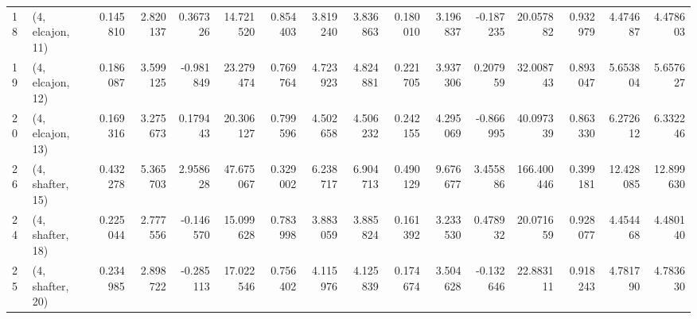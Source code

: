 \begin{tabular}{llrrrrrrrrrrrrrr}
18 &  (4, elcajon, 11) &   0.145810 &  2.820137 &  0.367326 &  14.721520 &  0.854403 &   3.819240 &  3.836863 &  0.180010 &  3.196837 & -0.187235 &   20.057882 &  0.932979 &   4.474687 &   4.478603 \\
19 &  (4, elcajon, 12) &   0.186087 &  3.599125 & -0.981849 &  23.279474 &  0.769764 &   4.723923 &  4.824881 &  0.221705 &  3.937306 &  0.207959 &   32.008743 &  0.893047 &   5.653804 &   5.657627 \\
20 &  (4, elcajon, 13) &   0.169316 &  3.275673 &  0.179443 &  20.306127 &  0.799596 &   4.502658 &  4.506232 &  0.242155 &  4.295069 & -0.866995 &   40.097339 &  0.863330 &   6.272612 &   6.332246 \\
26 &  (4, shafter, 15) &   0.432278 &  5.365703 &  2.958628 &  47.675067 &  0.329002 &   6.238717 &  6.904713 &  0.490129 &  9.676677 &  3.455886 &  166.400446 &  0.399181 &  12.428085 &  12.899630 \\
24 &  (4, shafter, 18) &   0.225044 &  2.777556 & -0.146570 &  15.099628 &  0.783998 &   3.883059 &  3.885824 &  0.161392 &  3.233530 &  0.478932 &   20.071659 &  0.928077 &   4.454468 &   4.480140 \\
25 &  (4, shafter, 20) &   0.234985 &  2.898722 & -0.285113 &  17.022546 &  0.756402 &   4.115976 &  4.125839 &  0.174674 &  3.504628 & -0.132646 &   22.883111 &  0.918243 &   4.781790 &   4.783630 \\
\bottomrule
\end{tabular}
